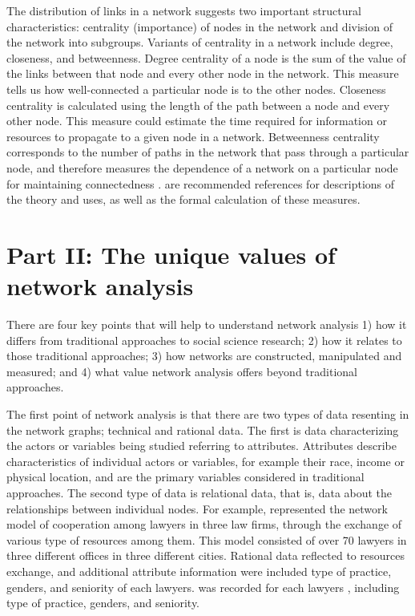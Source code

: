 The distribution of links in a network suggests two important structural characteristics: centrality (importance) of nodes in the network and division of the network into subgroups. Variants of centrality in a network include degree, closeness, and betweenness. Degree centrality of a node is the sum of the value of the links between that node and every other node in the network. This measure tells us how well-connected a particular node is to the other nodes. Closeness centrality is calculated using the length of the path between a node and every other node. This measure could estimate the time required for information or resources to propagate to a given node in a network. Betweenness centrality corresponds to the number of paths in the network that pass through a particular node, and therefore measures the dependence of a network on a particular node for maintaining connectedness .  are recommended references for descriptions of the theory and uses, as well as the formal calculation of these measures.


\section*{Part II: The unique values of network analysis}

There are four key points that will help to understand network analysis 1) how it differs from traditional approaches to social science research; 2) how it relates to those traditional approaches; 3) how networks are constructed, manipulated and measured; and 4) what value network analysis offers beyond traditional approaches.

The first point of network analysis is that there are two types of data resenting in the network graphs; technical and rational data. The first is data characterizing the actors or variables being studied referring to attributes. Attributes describe characteristics of individual actors or variables, for example their race, income or physical location, and are the primary variables considered in traditional approaches. The second type of data is relational data, that is, data about the relationships between individual nodes. For example,  represented the network model of cooperation among lawyers in three law firms, through the exchange of various type of resources among them. This model consisted of over 70 lawyers in three different offices in three different cities. Rational data reflected to resources exchange, and additional attribute information were included type of practice, genders, and seniority of each lawyers.
was recorded for each lawyers , including type of practice, genders, and seniority.

